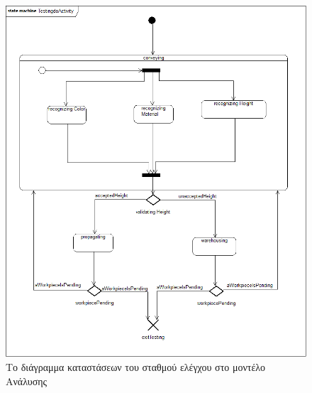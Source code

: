 \documentclass[a4paper,12pt,twoside]{report}
\begin{document}
{\begin{appendices}
			\begin{figure}[hp]
					\centering
					\includegraphics[scale=0.30]{AnalysisModel_stm-TestingStation(Testingstate).png}
					\caption{Το διάγραμμα καταστάσεων του σταθμού ελέγχου στο μοντέλο Ανάλυσης}
					\label{φωτ:Το διάγραμμα καταστάσεων του σταθμού ελέγχου στο μοντέλο Ανάλυσης}
			\end{figure}
			

\end{appendices}}
\end{document}
